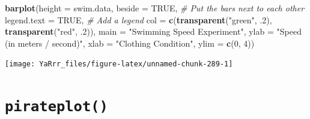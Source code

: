 \documentclass[]{book}
\newenvironment{Shaded}{\begin{snugshade}}{\end{snugshade}}
\newcommand{\KeywordTok}[1]{\textcolor[rgb]{0.13,0.29,0.53}{\textbf{#1}}}
\newcommand{\DataTypeTok}[1]{\textcolor[rgb]{0.13,0.29,0.53}{#1}}
\newcommand{\DecValTok}[1]{\textcolor[rgb]{0.00,0.00,0.81}{#1}}
\newcommand{\StringTok}[1]{\textcolor[rgb]{0.31,0.60,0.02}{#1}}
\newcommand{\CommentTok}[1]{\textcolor[rgb]{0.56,0.35,0.01}{\textit{#1}}}
\newcommand{\OtherTok}[1]{\textcolor[rgb]{0.56,0.35,0.01}{#1}}
\newcommand{\NormalTok}[1]{#1}
\theoremstyle{definition}
\theoremstyle{definition}
\theoremstyle{remark}
\begin{document}
\begin{Shaded}
\begin{Highlighting}[]
\KeywordTok{barplot}\NormalTok{(}\DataTypeTok{height =}\NormalTok{ swim.data,}
        \DataTypeTok{beside =} \OtherTok{TRUE}\NormalTok{,                        }\CommentTok{# Put the bars next to each other}
        \DataTypeTok{legend.text =} \OtherTok{TRUE}\NormalTok{,                   }\CommentTok{# Add a legend}
        \DataTypeTok{col =} \KeywordTok{c}\NormalTok{(}\KeywordTok{transparent}\NormalTok{(}\StringTok{"green"}\NormalTok{, .}\DecValTok{2}\NormalTok{), }
                \KeywordTok{transparent}\NormalTok{(}\StringTok{"red"}\NormalTok{, .}\DecValTok{2}\NormalTok{)),}
        \DataTypeTok{main =} \StringTok{"Swimming Speed Experiment"}\NormalTok{,}
        \DataTypeTok{ylab =} \StringTok{"Speed (in meters / second)"}\NormalTok{,}
        \DataTypeTok{xlab =} \StringTok{"Clothing Condition"}\NormalTok{,}
        \DataTypeTok{ylim =} \KeywordTok{c}\NormalTok{(}\DecValTok{0}\NormalTok{, }\DecValTok{4}\NormalTok{))}
\end{Highlighting}
\end{Shaded}

\begin{center}\texttt{[image: YaRrr\_files/figure-latex/unnamed-chunk-289-1]} \end{center}

\section{\texorpdfstring{\texttt{pirateplot()}}{pirateplot()}}\label{pirateplot}
\end{document}
